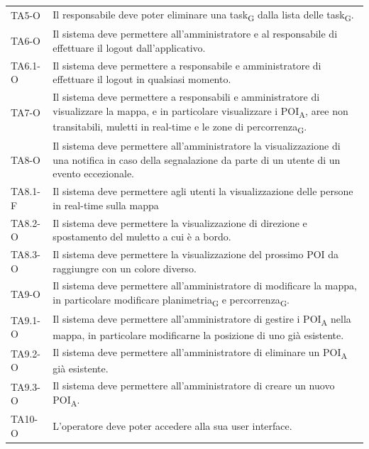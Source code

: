 \begin{longtable}{ >{\centering}p{} >{}p{}}
	TA5-O & Il responsabile deve poter eliminare una task\textsubscript{G} dalla lista delle task\textsubscript{G}. \tabularnewline

	TA6-O & Il sistema deve permettere all'amministratore e al responsabile di effettuare il logout dall'applicativo.\tabularnewline
	TA6.1-O & Il sistema deve permettere a responsabile e amministratore di effettuare il logout in qualsiasi momento. \tabularnewline

	TA7-O & Il sistema deve permettere a responsabili e amministratore di visualizzare la mappa, e in particolare visualizzare i POI\textsubscript{A}, aree non transitabili, muletti in real-time e le zone di percorrenza\textsubscript{G}. \tabularnewline

	TA8-O & Il sistema deve permettere all'amministratore la visualizzazione di una notifica in caso della segnalazione da parte di un utente di un evento eccezionale.\tabularnewline

	TA8.1-F & Il sistema deve permettere agli utenti la visualizzazione delle persone in real-time sulla mappa\tabularnewline
	
	TA8.2-O & Il sistema deve permettere la visualizzazione di direzione e spostamento del muletto a cui è a bordo. \tabularnewline
	
	TA8.3-O & Il sistema deve permettere la visualizzazione del prossimo POI da raggiungre con un colore diverso. \tabularnewline

	TA9-O & Il sistema deve permettere all'amministratore di modificare la mappa, in particolare modificare planimetria\textsubscript{G} e percorrenza\textsubscript{G}. \tabularnewline
	TA9.1-O & Il sistema deve permettere all'amministratore di gestire i POI\textsubscript{A} nella mappa, in particolare modificarne la posizione di uno già esistente. \tabularnewline
	TA9.2-O & Il sistema deve permettere all'amministratore di eliminare un POI\textsubscript{A} già esistente. \tabularnewline
	TA9.3-O & Il sistema deve permettere all'amministratore di creare un nuovo POI\textsubscript{A}. \tabularnewline

	TA10-O & L'operatore deve poter accedere alla sua user interface.\tabularnewline


\end{longtable}
